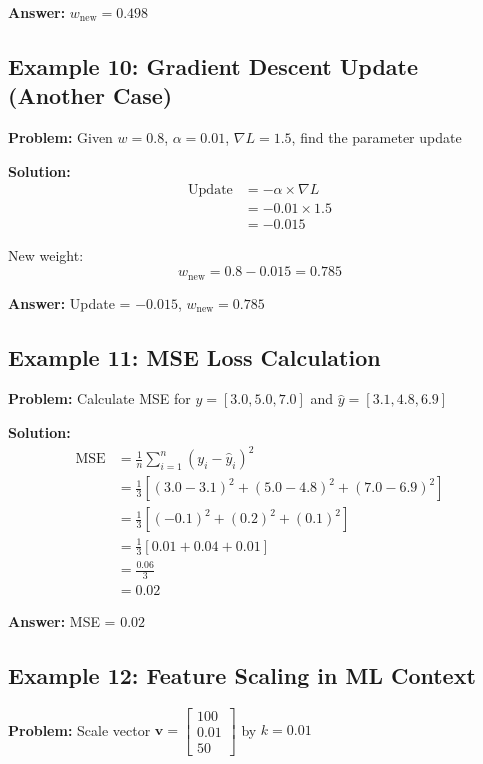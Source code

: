 \documentclass[11pt,a4paper]{article}
\begin{document}
\textbf{Answer:} $w_{\text{new}} = 0.498$

\subsection{Example 10: Gradient Descent Update (Another Case)}

\textbf{Problem:} Given $w = 0.8$, $\alpha = 0.01$, $\nabla L = 1.5$, find the parameter update

\textbf{Solution:}
\begin{align}
    \text{Update} &= -\alpha \times \nabla L \\
    &= -0.01 \times 1.5 \\
    &= -0.015
\end{align}

New weight:
\begin{equation}
    w_{\text{new}} = 0.8 - 0.015 = 0.785
\end{equation}

\textbf{Answer:} Update = $-0.015$, $w_{\text{new}} = 0.785$

\subsection{Example 11: MSE Loss Calculation}

\textbf{Problem:} Calculate MSE for $y = [3.0, 5.0, 7.0]$ and $\hat{y} = [3.1, 4.8, 6.9]$

\textbf{Solution:}
\begin{align}
    \text{MSE} &= \frac{1}{n} \sum_{i=1}^{n} (y_i - \hat{y}_i)^2 \\
    &= \frac{1}{3} [(3.0-3.1)^2 + (5.0-4.8)^2 + (7.0-6.9)^2] \\
    &= \frac{1}{3} [(-0.1)^2 + (0.2)^2 + (0.1)^2] \\
    &= \frac{1}{3} [0.01 + 0.04 + 0.01] \\
    &= \frac{0.06}{3} \\
    &= 0.02
\end{align}

\textbf{Answer:} MSE = $0.02$

\subsection{Example 12: Feature Scaling in ML Context}

\textbf{Problem:} Scale vector $\mathbf{v} = \begin{bmatrix} 100 \\ 0.01 \\ 50 \end{bmatrix}$ by $k = 0.01$
\end{document}
